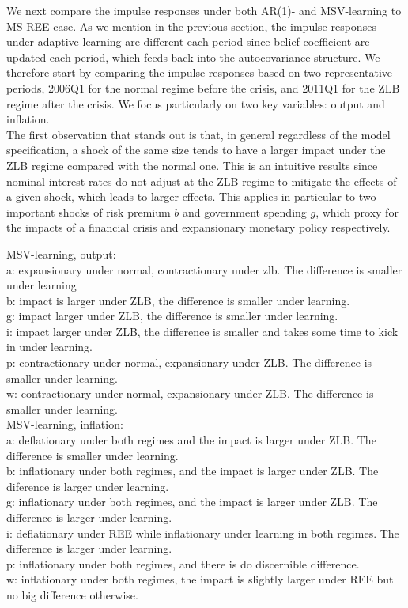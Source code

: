 \documentclass[12pt,reqno]{article}
\numberwithin{equation}{section}
\begin{document}

We next compare the impulse responses under both AR(1)- and MSV-learning to MS-REE case. As we mention in the previous section, the impulse responses under adaptive learning are different each period since belief coefficient are updated each period, which feeds back into the autocovariance structure. We therefore start by comparing the impulse responses based on two representative periods, 2006Q1 for the normal regime before the crisis, and 2011Q1 for the ZLB regime after the crisis. We focus particularly on two key variables: output and inflation. \\

\noindent
The first observation that stands out is that, in general regardless of the model specification, a shock of the same size tends to have a larger impact under the ZLB regime compared with the normal one. This is an intuitive results since nominal interest rates do not adjust at the ZLB regime to mitigate the effects of a given shock, which leads to larger effects. This applies in particular to two important shocks of risk premium $b$ and government spending $g$, which proxy for the impacts of a financial crisis and expansionary monetary policy respectively. 


MSV-learning, output: \\
a: expansionary under normal, contractionary under zlb. The difference is smaller under learning\\
b: impact is larger under ZLB, the difference is smaller under learning. \\
g: impact larger under ZLB, the difference is smaller under learning. \\
i: impact larger under ZLB, the difference is smaller and takes some time to kick in under learning. \\
p: contractionary under normal, expansionary under ZLB. The difference is smaller under learning. \\
w: contractionary under normal, expansionary under ZLB. The difference is smaller under learning. \\

MSV-learning, inflation: \\
a: deflationary under both regimes and the impact is larger under ZLB. The difference is smaller under learning. \\
b: inflationary under both regimes, and the impact is larger under ZLB. The diference is larger under learning. \\
g: inflationary under both regimes, and the impact is larger under ZLB. The difference is larger under learning. \\
i: deflationary under REE while inflationary under learning in both regimes. The difference is larger under learning. \\
p: inflationary under both regimes, and there is do discernible difference. \\
w: inflationary under both regimes, the impact is slightly larger under REE but no big difference otherwise. \\
\end{document}
